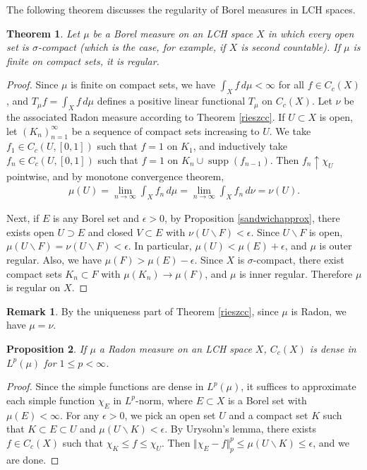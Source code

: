 \documentclass{article}
\numberwithin{equation}{section}
\DeclareMathOperator{\supp}{supp}
\theoremstyle{plain}
\newtheorem{theorem}{Theorem}[section]
\newtheorem{proposition}[theorem]{Proposition}
\theoremstyle{definition}
\newtheorem*{remark}{Remark}
\begin{document}
The following theorem discusses the regularity of Borel measures in LCH spaces.
\begin{theorem}\label{borelisradon}
	Let $\mu$ be a Borel measure on an LCH space $X$ in which every open set is $\sigma$-compact (which is the case, for example, if $X$ is second countable). If $\mu$ is finite on compact sets, it is regular.
\end{theorem}
\begin{proof}
	Since $\mu$ is finite on compact sets, we have $\int_X f\,d\mu<\infty$ for all $f\in C_c(X)$, and $T_\mu f=\int_X f\,d\mu$ defines a positive linear functional $T_\mu$ on $C_c(X)$. Let $\nu$ be the associated Radon measure according to Theorem \ref{rieszcc}. If $U\subset X$ is open, let $(K_n)_{n=1}^\infty$ be a sequence of compact sets increasing to $U$. We take $f_1\in C_c(U,[0,1])$ such that $f=1$ on $K_1$, and inductively take $f_n\in C_c(U,[0,1])$ such that $f=1$ on $K_n\cup\supp(f_{n-1})$. Then $f_n\uparrow \chi_U$ pointwise, and by monotone convergence theorem,
	\begin{align*}
		\mu(U)=\lim_{n\to\infty}\int_X f_n\,d\mu=\lim_{n\to\infty}\int_X f_n\,d\nu=\nu(U).
	\end{align*}
	
	Next, if $E$ is any Borel set and $\epsilon>0$, by Proposition \ref{sandwichapprox}, there exists open $U\supset E$ and closed $V\subset E$ with $\nu(U\backslash F)<\epsilon$. Since $U\backslash F$ is open, $\mu(U\backslash F)=\nu(U\backslash F)<\epsilon$. In particular, $\mu(U)<\mu(E)+\epsilon$, and $\mu$ is outer regular. Also, we have $\mu(F)>\mu(E)-\epsilon$. Since $X$ is $\sigma$-compact, there exist compact sets $K_n\subset F$ with $\mu(K_n)\to\mu(F)$, and $\mu$ is inner regular. Therefore $\mu$ is regular on $X$.
\end{proof}
\begin{remark} By the uniqueness part of Theorem \ref{rieszcc}, since $\mu$ is Radon, we have $\mu=\nu$.
\end{remark}

\begin{proposition}\label{ccdenseinlp}
	If $\mu$ a Radon measure on an LCH space $X$, $C_c(X)$ is dense in $L^p(\mu)$ for $1\leq p<\infty$. 
\end{proposition}
\begin{proof}
	Since the simple functions are dense in $L^p(\mu)$, it suffices to approximate each simple function $\chi_E$ in $L^p$-norm, where $E\subset X$ is a Borel set with $\mu(E)<\infty$. For any $\epsilon>0$, we pick an open set $U$ and a compact set $K$ such that $K\subset E\subset U$ and $\mu(U\backslash K)<\epsilon$. By Urysohn's lemma, there exists $f\in C_c(X)$ such that $\chi_K\leq f\leq\chi_U$. Then $\Vert\chi_E-f\Vert_p^p\leq\mu(U\backslash K)\leq\epsilon$, and we are done.
\end{proof}
\end{document}
